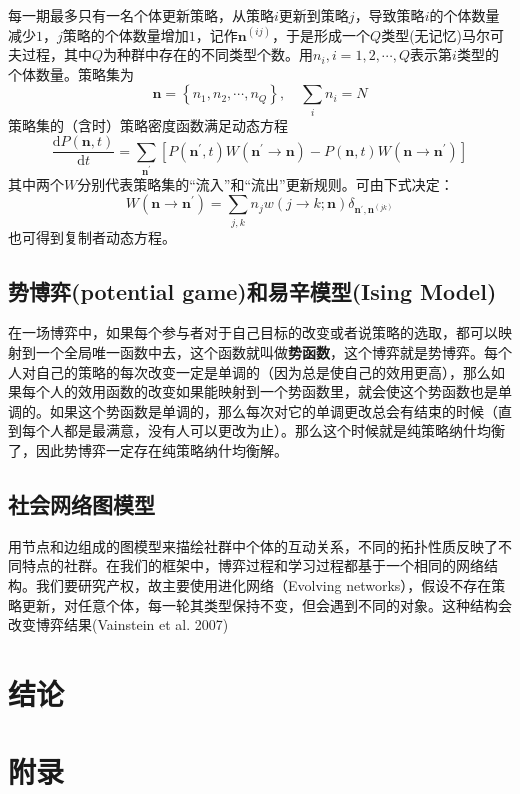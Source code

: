 \documentclass[lang=cn,12pt,a4paper]{elegantpaper}
\begin{document}
每一期最多只有一名个体更新策略，从策略\(i\)更新到策略\(j\)，导致策略\(i\)的个体数量减少\(1\)，\(j\)策略的个体数量增加\(1\)，记作\(\boldsymbol{n}^{(ij)}\)，于是形成一个\(Q\)类型(无记忆)马尔可夫过程，其中\(Q\)为种群中存在的不同类型个数。用\(n_i,i=1,2,\cdots ,Q\)表示第\(i\)类型的个体数量。策略集为
\begin{equation}
    \boldsymbol{n}=\left\{ n_1,n_2,\cdots ,n_Q\right\},\quad \sum_i n_i=N
\end{equation}
策略集的（含时）策略密度函数满足动态方程
\begin{equation}
    \frac{\mathrm{d} P(\boldsymbol{n}, t)}{\mathrm{d} t}=\sum_{\boldsymbol{n}^{\prime}}\left[P\left(\boldsymbol{n}^{\prime}, t\right) W\left(\boldsymbol{n}^{\prime} \rightarrow \boldsymbol{n}\right)-P(\boldsymbol{n}, t) W\left(\boldsymbol{n} \rightarrow \boldsymbol{n}^{\prime}\right)\right]
\end{equation}
其中两个\(W\)分别代表策略集的“流入”和“流出”更新规则。可由下式决定：
\begin{equation}
    W\left(\boldsymbol{n} \rightarrow \boldsymbol{n}^{\prime}\right)=\sum_{j, k} n_{j} w(j \rightarrow k ; \boldsymbol{n}) \delta_{\boldsymbol{n}^{\prime}, \boldsymbol{n}^{(j k)}}
\end{equation}
也可得到复制者动态方程。

\subsection{势博弈(potential game)和易辛模型(Ising Model)}

在一场博弈中，如果每个参与者对于自己目标的改变或者说策略的选取，都可以映射到一个全局唯一函数中去，这个函数就叫做\textbf{势函数}，这个博弈就是势博弈。每个人对自己的策略的每次改变一定是单调的（因为总是使自己的效用更高），那么如果每个人的效用函数的改变如果能映射到一个势函数里，就会使这个势函数也是单调的。如果这个势函数是单调的，那么每次对它的单调更改总会有结束的时候（直到每个人都是最满意，没有人可以更改为止）。那么这个时候就是纯策略纳什均衡了，因此势博弈一定存在纯策略纳什均衡解。

\subsection{社会网络图模型}

用节点和边组成的图模型来描绘社群中个体的互动关系，不同的拓扑性质反映了不同特点的社群。在我们的框架中，博弈过程和学习过程都基于一个相同的网络结构。我们要研究产权，故主要使用进化网络（Evolving networks），假设不存在策略更新，对任意个体，每一轮其类型保持不变，但会遇到不同的对象。这种结构会改变博弈结果(Vainstein et al. 2007)




\section{结论}

\section{附录}
\end{document}
